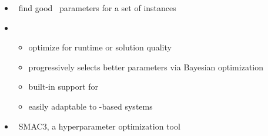 \begin{frame}{\acclingo}
  \begin{itemize}
    \item {} \ find good \clingo\ parameters for a set of instances
    \item {} \
      \begin{itemize}
        \item optimize for runtime or solution quality
        \item progressively selects better parameters via Bayesian optimization
        \item built-in support for \clingo
        \item easily adaptable to \clingo-based systems
      \end{itemize}
    \item {} \ SMAC3, a hyperparameter optimization tool
    \end{itemize}
  \end{frame}
%
